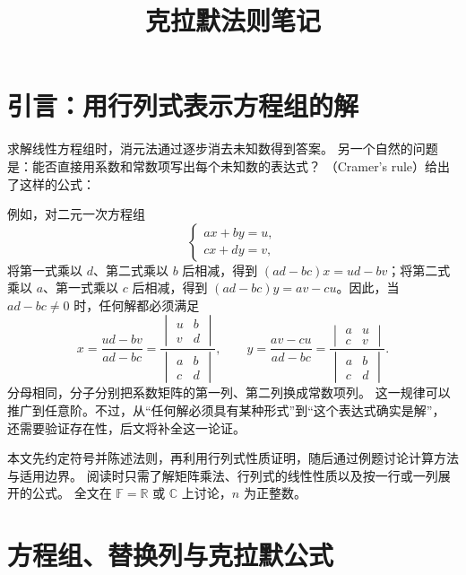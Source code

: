 \documentclass[UTF8,12pt,a4paper,fontset=fandol]{ctexart}
\title{克拉默法则笔记}
\author{}
\date{}
\begin{document}
\maketitle

\section{引言：用行列式表示方程组的解}

求解线性方程组时，消元法通过逐步消去未知数得到答案。
另一个自然的问题是：能否直接用系数和常数项写出每个未知数的表达式？
（Cramer's rule）给出了这样的公式：

例如，对二元一次方程组
\[
  \begin{cases}
    ax+by=u,\\
    cx+dy=v,
  \end{cases}
\]
将第一式乘以 $d$、第二式乘以 $b$ 后相减，得到
$(ad-bc)x=ud-bv$；将第二式乘以 $a$、第一式乘以 $c$ 后相减，得到
$(ad-bc)y=av-cu$。因此，当 $ad-bc\ne0$ 时，任何解都必须满足
\[
  x=\frac{ud-bv}{ad-bc}
   =\frac{\begin{vmatrix}u&b\\v&d\end{vmatrix}}
          {\begin{vmatrix}a&b\\c&d\end{vmatrix}},
  \qquad
  y=\frac{av-cu}{ad-bc}
   =\frac{\begin{vmatrix}a&u\\c&v\end{vmatrix}}
          {\begin{vmatrix}a&b\\c&d\end{vmatrix}}.
\]
分母相同，分子分别把系数矩阵的第一列、第二列换成常数项列。
这一规律可以推广到任意阶。不过，从“任何解必须具有某种形式”到“这个表达式确实是解”，
还需要验证存在性，后文将补全这一论证。

本文先约定符号并陈述法则，再利用行列式性质证明，随后通过例题讨论计算方法与适用边界。
阅读时只需了解矩阵乘法、行列式的线性性质以及按一行或一列展开的公式。
全文在 $\mathbb F=\mathbb R$ 或 $\mathbb C$ 上讨论，$n$ 为正整数。

\section{方程组、替换列与克拉默公式}
\end{document}
